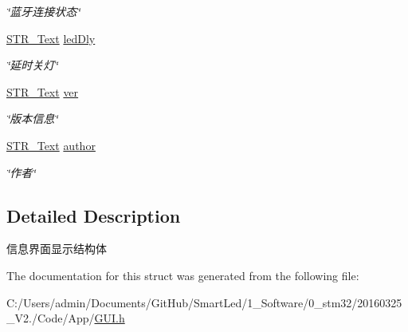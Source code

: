 \begin{DoxyCompactItemize}
\begin{DoxyCompactList}\small\item\em \char`\"{}蓝牙连接状态\char`\"{} \end{DoxyCompactList}\item 
\hypertarget{struct_s_t_r___gui_info_a3db55d7e859c5a56d11f6aea7d2bc5b2}{\hyperlink{struct_s_t_r___text}{\-S\-T\-R\-\_\-\-Text} \hyperlink{struct_s_t_r___gui_info_a3db55d7e859c5a56d11f6aea7d2bc5b2}{led\-Dly}}\label{struct_s_t_r___gui_info_a3db55d7e859c5a56d11f6aea7d2bc5b2}

\begin{DoxyCompactList}\small\item\em \char`\"{}延时关灯\char`\"{} \end{DoxyCompactList}\item 
\hypertarget{struct_s_t_r___gui_info_a2ed23f3f2bf610670b9853de3fbbbfd5}{\hyperlink{struct_s_t_r___text}{\-S\-T\-R\-\_\-\-Text} \hyperlink{struct_s_t_r___gui_info_a2ed23f3f2bf610670b9853de3fbbbfd5}{ver}}\label{struct_s_t_r___gui_info_a2ed23f3f2bf610670b9853de3fbbbfd5}

\begin{DoxyCompactList}\small\item\em \char`\"{}版本信息\char`\"{} \end{DoxyCompactList}\item 
\hypertarget{struct_s_t_r___gui_info_ac8e01372697c2f1d32696bef360b92c0}{\hyperlink{struct_s_t_r___text}{\-S\-T\-R\-\_\-\-Text} \hyperlink{struct_s_t_r___gui_info_ac8e01372697c2f1d32696bef360b92c0}{author}}\label{struct_s_t_r___gui_info_ac8e01372697c2f1d32696bef360b92c0}

\begin{DoxyCompactList}\small\item\em \char`\"{}作者\char`\"{} \end{DoxyCompactList}\end{DoxyCompactItemize}


\subsection{\-Detailed \-Description}
信息界面显示结构体 

\-The documentation for this struct was generated from the following file\-:\begin{DoxyCompactItemize}
\item 
\-C\-:/\-Users/admin/\-Documents/\-Git\-Hub/\-Smart\-Led/1\-\_\-\-Software/0\-\_\-stm32/20160325\-\_\-\-V2./\-Code/\-App/\hyperlink{_g_u_i_8h}{\-G\-U\-I.\-h}\end{DoxyCompactItemize}
